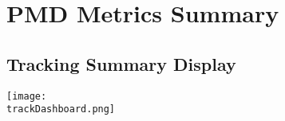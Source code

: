 %
% 
% 
%
%
\section{PMD Metrics Summary}

\subsection{Tracking Summary Display}

\begin{center}
\texttt{[image: \\trackDashboard.png]}
\end{center}

